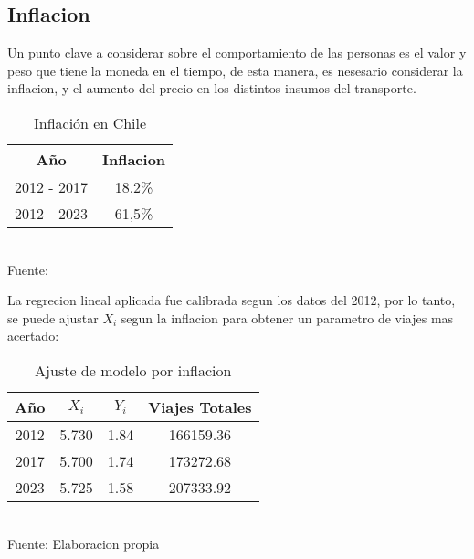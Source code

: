 \documentclass[12pt]{article} %
\begin{document}
\subsection{Inflacion}

Un punto clave a considerar sobre el comportamiento de las personas es el valor y peso que tiene la moneda en el tiempo, de esta manera, es nesesario considerar la inflacion, y el aumento del precio en los distintos insumos del transporte.

\begin{table}[H]
    \centering
    \caption{Inflación en Chile}
    \vspace{0.2cm}
    \begin{tabular}{|c|c|}
        \hline
        Año & Inflacion \\
        \hline
        2012 - 2017 & 18,2\% \\
        2012 - 2023 & 61,5\% \\
        \hline
    \end{tabular}
    \vspace{0.2cm}
    \\Fuente: \textbf{\cite{ipc}}
\end{table}

La regrecion lineal aplicada fue calibrada segun los datos del 2012, por lo tanto, se puede ajustar $X_i$ segun la inflacion para obtener un parametro de viajes mas acertado:



\begin{table}[H]
    \centering
    \caption{Ajuste de modelo por inflacion}
    \vspace{0.2cm}
    \begin{tabular}{|c|c|c|c|}
        \hline
        Año & $X_i$ & $Y_i$ & Viajes Totales \\
        \hline
        2012 & 5.730 & 1.84 & 166159.36\\
        2017 & 5.700 & 1.74 & 173272.68\\
        2023 & 5.725 & 1.58 & 207333.92\\
        \hline
    \end{tabular}
    \vspace{0.2cm}
    \\Fuente: Elaboracion propia
\end{table}
\end{document}
